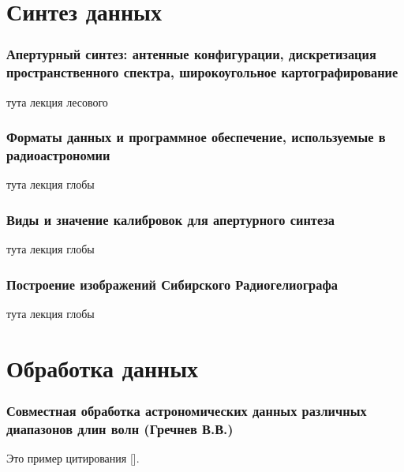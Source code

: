 



	

\newpage

\tableofcontents 
\newpage

\part{Синтез данных}

\section{Апертурный синтез: антенные конфигурации, дискретизация пространственного спектра, широкоугольное картографирование}
тута лекция лесового

\section{Форматы данных и программное обеспечение, используемые в радиоастрономии}
тута лекция глобы

\section{Виды и значение калибровок для апертурного синтеза}
тута лекция глобы

\section{Построение изображений Сибирского Радиогелиографа}
тута лекция глобы

\newpage

\part{Обработка данных}

\section{Совместная обработка астрономических данных различных диапазонов длин волн (Гречнев В.В.)}
 

Это пример цитирования [\cite{example}].
\printbibliography

